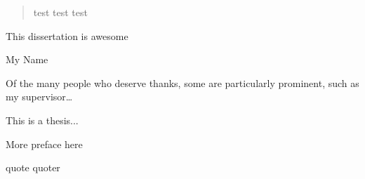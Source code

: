 
\begin{abstract}%
  test test test
\end{abstract}


\begin{declaration}
  This dissertation is awesome
  \vspace*{1cm}
  \begin{flushright}
    My Name
  \end{flushright}
\end{declaration}


\begin{acknowledgements}
  Of the many people who deserve thanks, some are particularly prominent,
  such as my supervisor\dots
\end{acknowledgements}


\begin{preface}
  This is a thesis...

  \noindent
  More preface here
\end{preface}

\dedication{To me...}

\tableofcontents

\frontquote%
  {quote}%
  {quoter}


